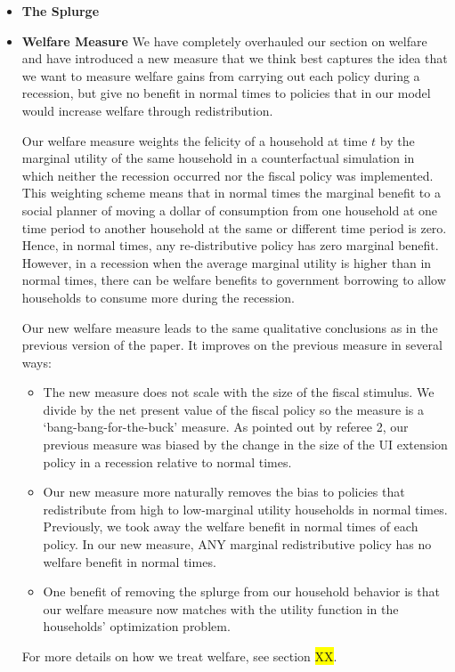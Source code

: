 \begin{itemize}
	\item \textbf{The Splurge}
	\item \textbf{Welfare Measure} We have completely overhauled our section on welfare and have introduced a new measure that we think best captures the idea that we want to measure welfare gains from carrying out each policy during a recession, but give no benefit in normal times to policies that in our model would increase welfare through redistribution. 
	
	Our welfare measure weights the felicity of a household at time $t$ by the marginal utility of the same household in a counterfactual simulation in which neither the recession occurred nor the fiscal policy was implemented. This weighting scheme means that in normal times the marginal benefit to a social planner of moving a dollar of consumption from one household at one time period to another household at the same or different time period is zero. Hence, in normal times, any re-distributive policy has zero marginal benefit. However, in a recession when the average marginal utility is higher than in normal times, there can be welfare benefits to government borrowing to allow households to consume more during the recession.
	
	Our new welfare measure leads to the same qualitative conclusions as in the previous version of the paper. It improves on the previous measure in several ways:
	\begin{itemize}
		\item The new measure does not scale with the size of the fiscal stimulus. We divide by the net present value of the fiscal policy so the measure is a `bang-bang-for-the-buck' measure. As pointed out by referee 2, our previous measure was biased by the change in the size of the UI extension policy in a recession relative to normal times.
		\item Our new measure more naturally removes the bias to policies that redistribute from high to low-marginal utility households in normal times. Previously, we took away the welfare benefit in normal times of each policy. In our new measure, ANY marginal redistributive policy has no welfare benefit in normal times.
		\item One benefit of removing the splurge from our household behavior is that our welfare measure now matches with the utility function in the households' optimization problem.
	\end{itemize}
	For more details on how we treat welfare, see section \colorbox{yellow}{XX}.
	

\end{itemize}
